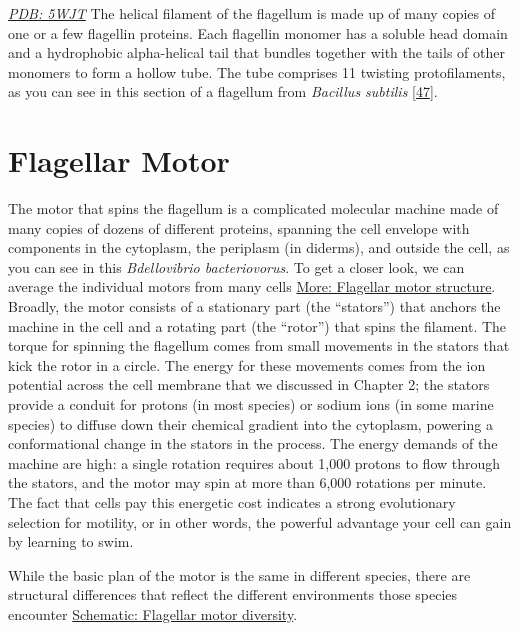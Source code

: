 \documentclass[]{tufte-book}
\begin{document}
\href{http://rcsb.org/structure/5WJT}{\emph{PDB: 5WJT}}
The helical filament of the flagellum is made up of many copies of one or a few flagellin proteins. Each flagellin monomer has a soluble head domain and a hydrophobic alpha-helical tail that bundles together with the tails of other monomers to form a hollow tube. The tube comprises 11 twisting protofilaments, as you can see in this section of a flagellum from \emph{Bacillus subtilis} {[}\protect\hyperlink{ref-wang2017}{47}{]}.

\hypertarget{flagellar-motor}{%
\section{Flagellar Motor}\label{flagellar-motor}}

The motor that spins the flagellum is a complicated molecular machine made of many copies of dozens of different proteins, spanning the cell envelope with components in the cytoplasm, the periplasm (in diderms), and outside the cell, as you can see in this \emph{Bdellovibrio bacteriovorus}. To get a closer look, we can average the individual motors from many cells \protect\hyperlink{Flagellar_motor_structure}{More: Flagellar motor structure}. Broadly, the motor consists of a stationary part (the ``stators'') that anchors the machine in the cell and a rotating part (the ``rotor'') that spins the filament. The torque for spinning the flagellum comes from small movements in the stators that kick the rotor in a circle. The energy for these movements comes from the ion potential across the cell membrane that we discussed in Chapter 2; the stators provide a conduit for protons (in most species) or sodium ions (in some marine species) to diffuse down their chemical gradient into the cytoplasm, powering a conformational change in the stators in the process. The energy demands of the machine are high: a single rotation requires about 1,000 protons to flow through the stators, and the motor may spin at more than 6,000 rotations per minute. The fact that cells pay this energetic cost indicates a strong evolutionary selection for motility, or in other words, the powerful advantage your cell can gain by learning to swim.

While the basic plan of the motor is the same in different species, there are structural differences that reflect the different environments those species encounter \protect\hyperlink{Flagellar_motor_diversity}{Schematic: Flagellar motor diversity}.
\end{document}
